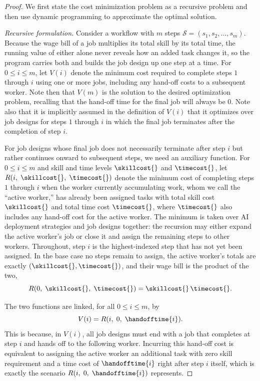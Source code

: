 \begin{proof}
We first state the cost minimization problem as a recursive problem and then use dynamic programming to approximate the optimal solution.

\emph{Recursive formulation.}
Consider a workflow with $m$ steps $\mathcal{S} = (s_1, s_2, \dotsc, s_m)$.
Because the wage bill of a job multiplies its total skill by its total time, the running value of either alone never reveals how an added task changes it, so the program carries both and builds the job design up one step at a time.
For $0 \leq i \leq m$, let $V(i)$ denote the minimum cost required to complete steps $1$ through $i$ using one or more jobs, including any hand-off costs to a subsequent worker.
Note then that $V(m)$ is the solution to the desired optimization problem, recalling that the hand-off time for the final job will always be $0$.
Note also that it is implicitly assumed in the definition of $V(i)$ that it optimizes over job designs for steps $1$ through $i$ in which the final job terminates after the completion of step $i$.

For job designs whose final job does not necessarily terminate after step $i$ but rather continues onward to subsequent steps, we need an auxiliary function.
For $0 \leq i \leq m$ and skill and time levels $\skillcost{}$ and $\timecost{}$, let $R(i,\; \skillcost{},\; \timecost{})$ denote the minimum cost of completing steps $1$ through $i$ when the worker currently accumulating work, whom we call the ``active worker,'' has already been assigned tasks with total skill cost $\skillcost{}$ and total time cost $\timecost{}$, where $\timecost{}$ also includes any hand-off cost for the active worker.
The minimum is taken over AI deployment strategies and job designs together: the recursion may either expand the active worker's job or close it and assign the remaining steps to other workers.
Throughout, step $i$ is the highest-indexed step that has not yet been assigned.
In the base case no steps remain to assign, the active worker's totals are exactly $(\skillcost{}, \timecost{})$, and their wage bill is the product of the two,
\[ R(0,\; \skillcost{},\; \timecost{}) = \skillcost{}\,\timecost{}. \]

The two functions are linked, for all $0 \leq i \leq m$, by
\[ V(i) = R(i,\; 0,\; \handofftime{i}). \]
This is because, in $V(i)$, all job designs must end with a job that completes at step $i$ and hands off to the following worker.
Incurring this hand-off cost is equivalent to assigning the active worker an additional task with zero skill requirement and a time cost of $\handofftime{i}$ right after step $i$ itself, which is exactly the scenario $R(i,\; 0,\; \handofftime{i})$ represents.


\end{proof}
